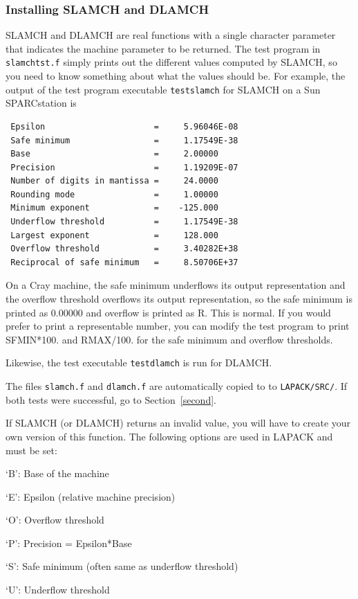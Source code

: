 \documentclass[11pt]{report}
\begin{document}
\subsubsection{Installing SLAMCH and DLAMCH}

SLAMCH and DLAMCH are real functions with a single character parameter
that indicates the machine parameter to be returned.  The test 
program in \texttt{slamchtst.f}
simply prints out the different values computed by SLAMCH,
so you need to know something about what the values should be. 
For example, the output of the test program executable \texttt{testslamch}
for SLAMCH on a Sun SPARCstation is
\begin{verbatim}
 Epsilon                      =     5.96046E-08
 Safe minimum                 =     1.17549E-38
 Base                         =     2.00000
 Precision                    =     1.19209E-07
 Number of digits in mantissa =     24.0000
 Rounding mode                =     1.00000
 Minimum exponent             =    -125.000
 Underflow threshold          =     1.17549E-38
 Largest exponent             =     128.000
 Overflow threshold           =     3.40282E+38
 Reciprocal of safe minimum   =     8.50706E+37
\end{verbatim}
On a Cray machine, the safe minimum underflows its output
representation and the overflow threshold overflows its output
representation, so the safe minimum is printed as 0.00000 and overflow
is printed as R.  This is normal.
If you would prefer to print a representable number, you can modify
the test program to print SFMIN*100. and RMAX/100. for the safe
minimum and overflow thresholds.

Likewise, the test executable \texttt{testdlamch} is run for DLAMCH.

The files \texttt{slamch.f} and \texttt{dlamch.f} are automatically copied to
to \texttt{LAPACK/SRC/}.
If both tests were successful, go to Section~\ref{second}.

If SLAMCH (or DLAMCH) returns an invalid value, you will have to create
your own version of this function.  The following options are used in
LAPACK and must be set:

\begin{list}{}{}
\item {`B': }  Base of the machine
\item {`E': }  Epsilon (relative machine precision)
\item {`O': }  Overflow threshold
\item {`P': }  Precision = Epsilon*Base
\item {`S': }  Safe minimum (often same as underflow threshold)
\item {`U': }  Underflow threshold
\end{list}
\end{document}
